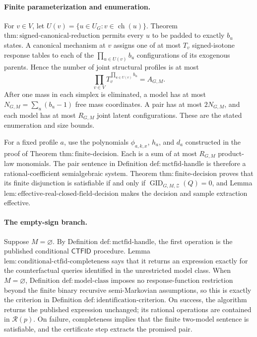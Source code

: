 \paragraph{Finite parameterization and enumeration.}
For \(v\in V\), let \(U(v)=\{u\in U_G:v\in\operatorname{ch}(u)\}\).  Theorem \(\mathrm{thm:signed\text{-}canonical\text{-}reduction}\) permits every \(u\) to be padded to exactly \(b_u\) states.  A canonical mechanism at \(v\) assigns one of at most \(T_v\) signed-isotone response tables to each of the \(\prod_{u\in U(v)}b_u\) configurations of its exogenous parents.  Hence the number of joint structural profiles is at most
\[
 \prod_{v\in V}T_v^{\prod_{u\in U(v)}b_u}=A_{G,M}.
\]
After one mass in each simplex is eliminated, a model has at most \(N_{G,M}=\sum_u(b_u-1)\) free mass coordinates.  A pair has at most \(2N_{G,M}\), and each model has at most \(R_{G,M}\) joint latent configurations.  These are the stated enumeration and size bounds.

For a fixed profile \(a\), use the polynomials \(\phi_{a,k,x}\), \(h_a\), and \(d_a\) constructed in the proof of Theorem \(\mathrm{thm:finite\text{-}decision}\).  Each is a sum of at most \(R_{G,M}\) product-law monomials.  The pair sentence in Definition \(\mathrm{def:mctfid\text{-}handle}\) is therefore a rational-coefficient semialgebraic system.  Theorem \(\mathrm{thm:finite\text{-}decision}\) proves that its finite disjunction is satisfiable if and only if \(\operatorname{GID}_{G,M,\mathcal Z}(Q)=0\), and Lemma \(\mathrm{lem:effective\text{-}real\text{-}closed\text{-}field\text{-}decision}\) makes the decision and sample extraction effective.

\paragraph{The empty-sign branch.}
Suppose \(M=\varnothing\).  By Definition \(\mathrm{def:mctfid\text{-}handle}\), the first operation is the published conditional \(\mathsf{CTFID}\) procedure.  Lemma \(\mathrm{lem:conditional\text{-}ctfid\text{-}completeness}\) says that it returns an expression exactly for the counterfactual queries identified in the unrestricted model class.  When \(M=\varnothing\), Definition \(\mathrm{def:model\text{-}class}\) imposes no response-function restriction beyond the finite binary recursive semi-Markovian assumptions, so this is exactly the criterion in Definition \(\mathrm{def:identification\text{-}criterion}\).  On success, the algorithm returns the published expression unchanged; its rational operations are contained in \(\mathcal R(p)\).  On failure, completeness implies that the finite two-model sentence is satisfiable, and the certificate step extracts the promised pair.

